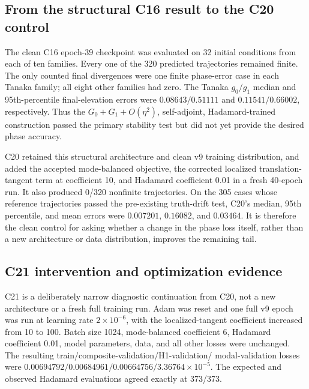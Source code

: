 \documentclass[11pt]{article}
\begin{document}
\subsection{From the structural C16 result to the C20 control}

The clean C16 epoch-39 checkpoint was evaluated on 32 initial conditions from
each of ten families.  Every one of the 320 predicted trajectories remained
finite.  The only counted final divergences were one finite phase-error case in
each Tanaka family; all eight other families had zero.  The Tanaka
\(g_0/g_1\) median and 95th-percentile final-elevation errors were
\(0.08643/0.51111\) and \(0.11541/0.66002\), respectively.  Thus the
\(G_0+G_1+O(\eta^2)\), self-adjoint, Hadamard-trained construction passed the
primary stability test but did not yet provide the desired phase accuracy.

C20 retained this structural architecture and clean v9 training distribution,
and added the accepted mode-balanced objective, the corrected localized
translation-tangent term at coefficient 10, and Hadamard coefficient 0.01 in
a fresh 40-epoch run.  It also produced 0/320 nonfinite trajectories.  On the
305 cases whose reference trajectories passed the pre-existing truth-drift
test, C20's median, 95th percentile, and mean errors were
\(0.007201\), \(0.16082\), and \(0.03464\).  It is therefore the clean
control for asking whether a change in the phase loss itself, rather than a
new architecture or data distribution, improves the remaining tail.

\subsection{C21 intervention and optimization evidence}

C21 is a deliberately narrow diagnostic continuation from C20, not a new
architecture or a fresh full training run.  Adam was reset and one full v9
epoch was run at learning rate \(2\times10^{-6}\), with the localized-tangent
coefficient increased from 10 to 100.  Batch size 1024, mode-balanced
coefficient 6, Hadamard coefficient 0.01, model parameters, data, and all other
losses were unchanged.  The resulting train/composite-validation/H1-validation/
modal-validation losses were
\(0.00694792/0.00684961/0.00664756/3.36764\times10^{-5}\).
The expected and observed Hadamard evaluations agreed exactly at 373/373.
\end{document}
